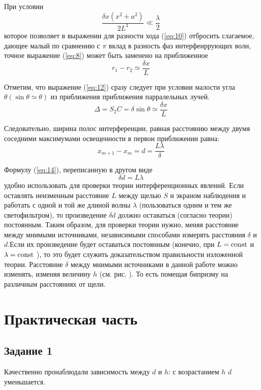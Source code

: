 При условии 
\begin{equation}
	\frac{\delta x(x^2+a^2)}{2L^3}\ll\frac{\lambda}{2}
\end{equation}
которое позволяет в выражении для разности хода (\ref{eq:10}) отбросить слагаемое, дающее малый по сравнению с $\pi$ вклад в разность фаз интерфеиррующих волн, точное выражение (\ref{eq:8}) может быть заменено на приближенное
\begin{equation}
 	r_1-r_2\simeq\frac{\delta x}{L} \label{eq:12}
 \end{equation} 
 
 Отметим, что выражение (\ref{eq:12}) сразу следует при условии малости угла 
 $\theta (\sin{\theta}\simeq\theta)$ из приближения приближения парралельных лучей. 
 \begin{equation}
 	\Delta=S_2C=\delta\sin{\theta}\simeq\frac{\delta x}{L}
 \end{equation}
 
 Следовательно, ширина полос интерференции, равная расстоянию между двумя соседними максимумами освещенности в первои приближении равна:
 \begin{equation}
 	x_{m+1}-x_m=d=\frac{L\lambda}{\delta} \label{eq:14}
 \end{equation}
 
 Формулу (\ref{eq:14}), переписанную в другом виде
 \begin{equation}
 	\delta d=L\lambda
 \end{equation}
 удобно использовать для проверки теории интерференционных явлений. Если оставлять неизменным расстояние $L$ между щелью $S$ и экраном наблюдения и работать с одной и той же длиной волны $\lambda$ (пользоваться одним и тем же светофильтром), то произведение $\delta d$ должно оставаться (согласно теории) постоянным. Таким образом, для проверки теории нужно, меняя расстояние между мнимыми источниками, независимыми способами измерять расстояния $\delta$ и $d$.Если их произведение будет оставаться постоянным (конечно, при $L= \text{\rmfamily\upshape const}$ и $\lambda=\text{\rmfamily\upshape const}$ ), то это будет служить доказательством правильности изложенной теории. Расстояние $\delta$ между мнимыми источниками в данной работе можно изменять, изменяя величину $h$ (см. рис. ). То есть помещая бипризму на различным расстояниях от щели.
\section{Практическая часть}
\subsection{Задание 1}
Качественно пронаблюдали зависимость между $d$ и $h$: с возрастанием $h$ $d$ уменьшается.

